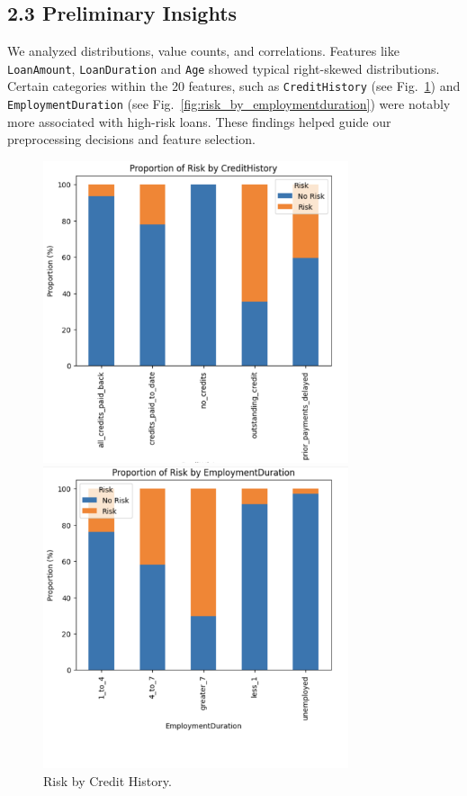 \documentclass[12pt]{report}
\begin{document}
\subsection*{2.3 Preliminary Insights}

We analyzed distributions, value counts, and correlations. Features like \texttt{LoanAmount}, \texttt{LoanDuration} and \texttt{Age} showed typical right-skewed distributions. Certain categories within the 20 features, such as \texttt{CreditHistory} (see Fig.~\ref{fig:risk_by_credithistory}) and \texttt{EmploymentDuration} (see Fig.~\ref{fig:risk_by_employmentduration}) were notably more associated with high-risk loans. These findings helped guide our preprocessing decisions and feature selection.

\begin{figure}[htbp]
    \centering
    \begin{minipage}[t]{0.45\textwidth}
        \centering
        \includegraphics[width=0.8\textwidth]{risk_by_credithistory.png}
        \caption{Risk by Credit History.}
        \label{fig:risk_by_credithistory}
    \end{minipage}
    \hfill
    \begin{minipage}[t]{0.45\textwidth}
        \centering
        \includegraphics[width=0.8\textwidth]{risk_by_employmentduration.png}

\end{minipage}
\end{figure}
\end{document}

